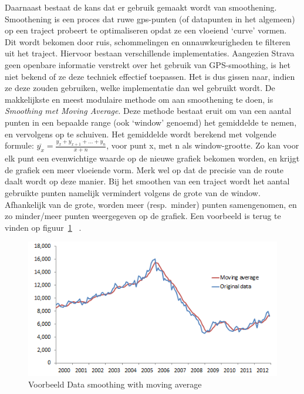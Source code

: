 Daarnaast bestaat de kans dat er gebruik gemaakt wordt van smoothening.
Smoothening is een proces dat ruwe gps-punten (of datapunten in het algemeen)
op een traject probeert te optimaliseren opdat ze een vloeiend `curve' vormen.
Dit wordt bekomen door ruis, schommelingen en onnauwkeurigheden te filteren uit
het traject. Hiervoor bestaan verschillende implementaties. Aangezien Strava
geen openbare informatie verstrekt over het gebruik van GPS-smoothing, is het
niet bekend of ze deze techniek effectief toepassen. Het is dus gissen naar,
indien ze deze zouden gebruiken, welke implementatie dan wel gebruikt wordt. De
makkelijkste en meest modulaire methode om aan smoothening te doen, is
\textit{Smoothing met Moving Average}. Deze methode bestaat eruit om van een
aantal punten in een bepaalde range (ook `window' genoemd) het gemiddelde te
nemen, en vervolgens op te schuiven. Het gemiddelde wordt berekend met volgende
formule: $\overline{y_x} = \frac{y_x + y_{x+1} + \ldots + y_{n}}{x+n}$, voor
punt x, met n als window-grootte. Zo kan voor elk punt een evenwichtige waarde
op de nieuwe grafiek bekomen worden, en krijgt de grafiek een meer vloeiende
vorm. Merk wel op dat de precisie van de route daalt wordt op deze manier. Bij
het smoothen van een traject wordt het aantal gebruikte punten namelijk
vermindert volgens de grote van de window. Afhankelijk van de grote, worden
meer (resp.\ minder) punten samengenomen, en zo minder/meer punten weergegeven
op de grafiek. Een voorbeeld is terug te vinden op
figuur~\ref{fig:SmoothingExample}
~\cite{Smoothin16:online}\cite{SmoothingandInterpolatingNoisyGPSDatawithSmoothingSplines}\cite{Smoothin86:online}.
\begin{figure}[h]
    \centering
    \includegraphics[width=0.6\linewidth]{fig/SmoothingExample.png}
    \caption{Voorbeeld Data smoothing with moving average}\label{fig:SmoothingExample}
\end{figure}

